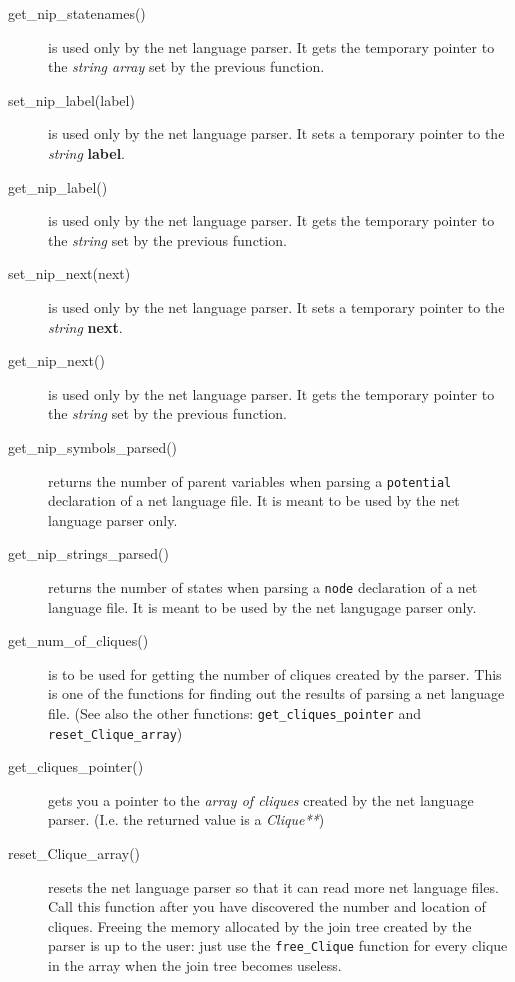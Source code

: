 \documentclass[12pt,a4paper]{report}
\newcommand{\cdatatype}[1]{{\it #1}}
\newcommand{\examplecode}[1]{\texttt{#1}}
\newcommand{\cparameter}[1]{\textbf{#1}}
\newcommand{\cfunction}[1]{\texttt{#1}}
\begin{document}
\begin{description}
\item[get\_nip\_statenames()] is used only by the net language
parser. It gets the temporary pointer to the \cdatatype{string array}
set by the previous function. 

\item[set\_nip\_label(label)] is used only by the net language
parser. It sets a temporary pointer to the \cdatatype{string}
\cparameter{label}.

\item[get\_nip\_label()] is used only by the net language
parser. It gets the temporary pointer to the \cdatatype{string}
set by the previous function.

\item[set\_nip\_next(next)] is used only by the net language
parser. It sets a temporary pointer to the \cdatatype{string}
\cparameter{next}.

\item[get\_nip\_next()] is used only by the net language
parser. It gets the temporary pointer to the \cdatatype{string}
set by the previous function.

\item[get\_nip\_symbols\_parsed()] returns the number of parent
variables when parsing a \examplecode{potential} declaration of a net
language file. It is meant to be used by the net language parser only.

\item[get\_nip\_strings\_parsed()] returns the number of states when
parsing a \examplecode{node} declaration of a net language file. It is
meant to be used by the net langugage parser only.

\item[get\_num\_of\_cliques()] is to be used for getting the number of
cliques created by the parser. This is one of the functions for
finding out the results of parsing a net language file. (See also the
other functions: \cfunction{get\_cliques\_pointer} and
\cfunction{reset\_Clique\_array}) 

\item[get\_cliques\_pointer()] gets you a pointer to the \cdatatype{array of
cliques} created by the net language parser. (I.e. the returned value
is a \cdatatype{Clique**})

\item[reset\_Clique\_array()] resets the net language parser so that
it can read more net language files. Call this function after you have
discovered the number and location of cliques. Freeing the memory
allocated by the join tree created by the parser is up to the user: 
just use the \cfunction{free\_Clique} function for every clique in the array
when the join tree becomes useless.

\end{description}
\end{document}

